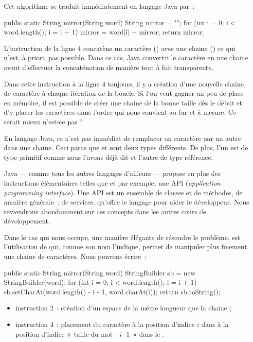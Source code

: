 	Cet algorithme se traduit immédiatement en langage Java par~:

	\begin{java}
public static String mirror(String word){
	String mirror = "";
	for (int i = 0; i < word.length(); i = i + 1){
		mirror = word[i] + mirror;
	}
	return mirror;
}
	\end{java}

	L'instruction de la ligne 4 concatène un caractère () avec une
	chaine () ce qui n'est, à priori, pas possible. Dans ce cas, Java
	convertit le caractère en une chaine avant d'effectuer la concaténation de
	manière tout à fait transparente. 

	Dans cette instruction à la ligne 4 toujours, il y a création d'une nouvelle
	chaine de caractère à chaque itération de la boucle. Si l'on veut gagner un
	peu de place en mémoire, il est possible de créer une chaine de la bonne
	taille dès le début et d'y placer les caractères dans l'ordre qui nous
	convient au fur et à mesure. Ce serait mieux n'est-ce pas ? 
	
	En langage Java, ce n'est pas immédiat de remplacer un caractère par un
	autre dans une chaine. Ceci parce que  et  sont
	deux types différents. De plus, l'un est de type primitif comme nous l'avons
	déjà dit et l'autre de type référence. 


	Java — comme tous les autres langages d'ailleurs — propose en plus des
	instructions élémentaires telles que  et  par exemple, une
	API (\textit{application programming interface}). Une API est un ensemble de
	classes et de méthodes, de manière générale~; de services, qu'offre le
	langage pour aider le développeur. Nous reviendrons abondamment sur ces
	concepts dans les autres cours de développement. 

	Dans le cas qui nous occupe, une manière élégante de résoudre le problème,
	est l'utilisation de  qui, comme son nom l'indique, permet
	de manipuler plus finement une chaine de caractères. 
	Nous pouvons écrire~:

	\begin{java}
public static String mirror(String word){
	StringBuilder sb = new StringBuilder(word);
	for (int i = 0; i < word.length(); i = i + 1){
		sb.setCharAt(word.length() - i - 1, word.charAt(i));
	}
	return sb.toString();
}
	\end{java}

	\begin{itemize}
		\item instruction 2~: création d'un espace de la mème longueur que la 
			chaine ;

		\item instruction 4~: placement du caractère à la position d'indice $i$
			dans  à la position d'indice «~taille du mot - $i$ -1~»
			dans le .

	\end{itemize}
	

